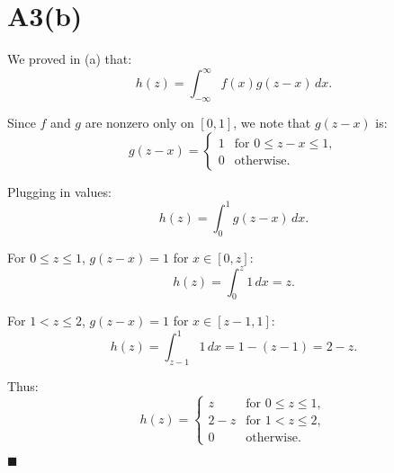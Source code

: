 \documentclass{article}
\begin{document}
\section*{A3(b)}

We proved in (a) that:
\[
h(z) = \int_{-\infty}^\infty f(x) g(z - x) \, dx.
\]

Since \( f \) and \( g \) are nonzero only on \([0,1]\), we note that \( g(z - x) \) is:
\[
g(z - x) =
\begin{cases}
1 & \text{for } 0 \leq z - x \leq 1, \\
0 & \text{otherwise.}
\end{cases}
\]

Plugging in values:
\[
h(z) = \int_0^1 g(z - x) \, dx.
\]

For \( 0 \leq z \leq 1 \), \( g(z - x) = 1 \) for \( x \in [0, z] \):
\[
h(z) = \int_0^z 1 \, dx = z.
\]

For \( 1 < z \leq 2 \), \( g(z - x) = 1 \) for \( x \in [z - 1, 1] \):
\[
h(z) = \int_{z-1}^1 1 \, dx = 1 - (z - 1) = 2 - z.
\]

Thus:
\[
h(z) =
\begin{cases}
z & \text{for } 0 \leq z \leq 1, \\
2 - z & \text{for } 1 < z \leq 2, \\
0 & \text{otherwise.}
\end{cases}
\]

\hfill\(\blacksquare\)
\end{document}
